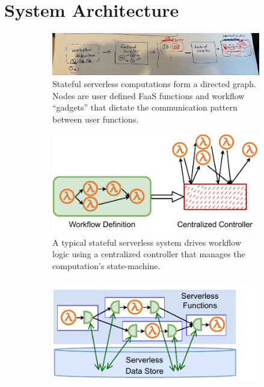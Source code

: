 

\section{System Architecture}\label{sec:architecture}

\begin{figure}[t]
    \centering
    \begin{subfigure}[t]{0.8\textwidth}
   \includegraphics[width=\columnwidth]{figures/architecture.png}
        \caption{Stateful serverless computations form a directed graph. Nodes
                are user defined FaaS functions and workflow ``gadgets'' that dictate the
                communication pattern between user functions.}
        \label{fig:arch:unum-compile-time}
    \end{subfigure}
    \begin{subfigure}[b]{\columnwidth}
    \centering
        \includegraphics[width=0.8\columnwidth]{figures/unum-arch-centralized.pdf}
        \caption{A typical stateful serverless system drives workflow logic
                 using a centralized controller that manages the computation's state-machine.}
        \label{fig:arch:centralized}
    \end{subfigure}
    \hfill
    \begin{subfigure}[b]{\columnwidth}
    \centering
        \includegraphics[width=0.5\columnwidth]{figures/unum-arch-runtime.pdf}

\end{subfigure}
\end{figure}

